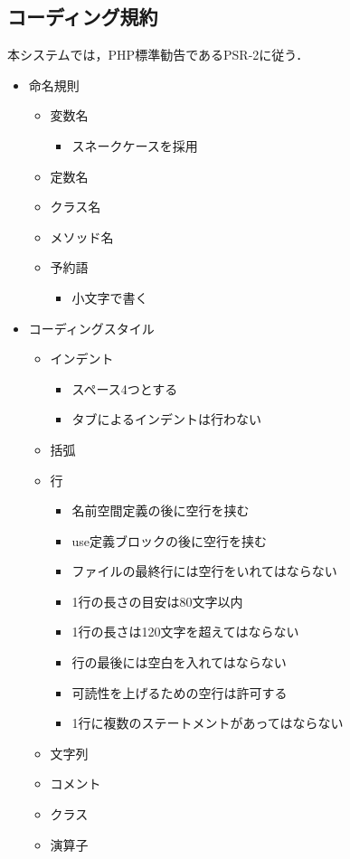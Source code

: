 \documentclass[a4paper, titlepage]{jsarticle}
\begin{document}
\subsection{コーディング規約}
本システムでは，PHP標準勧告であるPSR-2に従う．
\begin{itemize}
  \item 命名規則
  \begin{itemize}
    \item 変数名
    \begin{itemize}
      \item スネークケースを採用
    \end{itemize}
    \item 定数名
    \item クラス名
    \item メソッド名
    \item 予約語
    \begin{itemize}
      \item 小文字で書く
    \end{itemize}
  \end{itemize}
  \item コーディングスタイル
  \begin{itemize}
    \item インデント
    \begin{itemize}
      \item スペース4つとする
      \item タブによるインデントは行わない
    \end{itemize}
    \item 括弧
    \item 行
    \begin{itemize}
      \item 名前空間定義の後に空行を挟む
      \item use定義ブロックの後に空行を挟む
      \item ファイルの最終行には空行をいれてはならない
      \item 1行の長さの目安は80文字以内
      \item 1行の長さは120文字を超えてはならない
      \item 行の最後には空白を入れてはならない
      \item 可読性を上げるための空行は許可する
      \item 1行に複数のステートメントがあってはならない
    \end{itemize}
    \item 文字列
    \item コメント
    \item クラス
    \item 演算子
  \end{itemize}
\end{itemize}
\end{document}
